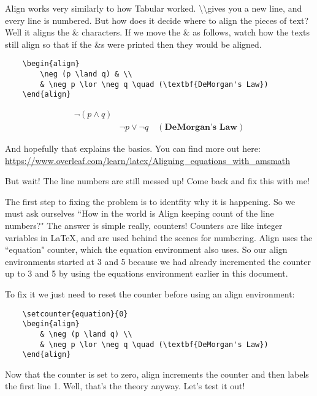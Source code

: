 \documentclass{article}
\begin{document}
Align works very similarly to how Tabular worked. \textbackslash \textbackslash gives you a new line, and every line is numbered. But how does it decide where to align the pieces of text? Well it aligns the \& characters. If we move the \& as follows, watch how the texts still align so that if the \&s were printed then they would be aligned.

\begin{verbatim}
    \begin{align}
        \neg (p \land q) & \\
        & \neg p \lor \neg q \quad (\textbf{DeMorgan's Law})
    \end{align}
\end{verbatim}

    \begin{align}
        \neg (p \land q) & \\
        & \neg p \lor \neg q \quad (\textbf{DeMorgan's Law})
    \end{align}

And hopefully that explains the basics. You can find more out here: 
\url{https://www.overleaf.com/learn/latex/Aligning_equations_with_amsmath} \medskip

\noindent But wait! The line numbers are still messed up! Come back and fix this with me! \medskip

The first step to fixing the problem is to identfity why it is happening. So we must ask ourselves ``How in the world is Align keeping count of the line numbers?" The answer is simple really, counters! Counters are like integer variables in \LaTeX{}, and are used behind the scenes for numbering. Align uses the ``equation" counter, which the equation environment also uses. So our align environments started at 3 and 5 because we had already incremented the counter up to 3 and 5 by using the equations environment earlier in this document. \medskip

\noindent To fix it we just need to reset the counter before using an align environment:

\begin{verbatim}
    \setcounter{equation}{0}
    \begin{align}
        & \neg (p \land q) \\
        & \neg p \lor \neg q \quad (\textbf{DeMorgan's Law})
    \end{align}
\end{verbatim}

Now that the counter is set to zero, align increments the counter and then labels the first line 1. Well, that's the theory anyway. Let's test it out!
\end{document}
